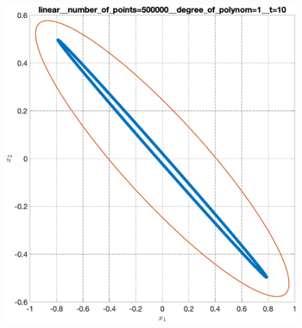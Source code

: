 \documentclass[../main.tex]{subfiles}
\begin{document}
\begin{figure}[ht!]
\begin{minipage}[b]{.3\linewidth}
 	\end{minipage} 
 	\vfill
 	\begin{minipage}[b]{.3\linewidth} 
 		\small
 		\centering 
 		\includegraphics[width=\linewidth]{images/linear__number_of_points=500000__degree_of_polynom=1__t=10.eps}
 		\label{fig:ap:linearN5105k1T10}
 	\end{minipage}
 	\hfill
 	\begin{minipage}[b]{.3\linewidth} 
 		\small
 		\centering

\end{minipage}
\end{figure}
\end{document}
